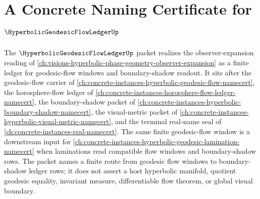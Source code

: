 \chapter{A Concrete Naming Certificate for $\HyperbolicGeodesicFlowLedgerUp$}
\label{ch:concrete-instances-hyperbolic-geodesic-flow-ledger-namecert}

The $\HyperbolicGeodesicFlowLedgerUp$ packet realizes the observer-expansion reading of \autoref{ch:visions-hyperbolic-phase-geometry-observer-expansion} as a finite ledger for geodesic-flow windows and boundary-shadow readout. It sits after the geodesic-flow carrier of \autoref{ch:concrete-instances-hyperbolic-geodesic-flow-namecert}, the horosphere-flow ledger of \autoref{ch:concrete-instances-horosphere-flow-ledger-namecert}, the boundary-shadow packet of \autoref{ch:concrete-instances-hyperbolic-boundary-shadow-namecert}, the visual-metric packet of \autoref{ch:concrete-instances-hyperbolic-visual-metric-namecert}, and the terminal real-name seal of \autoref{ch:concrete-instances-real-namecert}. The same finite geodesic-flow window is a downstream input for \autoref{ch:concrete-instances-hyperbolic-geodesic-lamination-namecert} when laminations read compatible flow windows and boundary-shadow rows. The packet names a finite route from geodesic flow windows to boundary-shadow ledger rows; it does not assert a host hyperbolic manifold, quotient geodesic equality, invariant measure, differentiable flow theorem, or global visual boundary.

